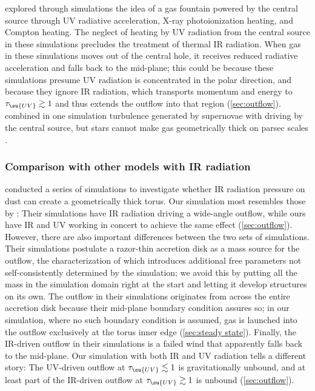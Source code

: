 \documentclass[twocolumn]{article}
\makeatletter
\newcommand*\Citetseealso[3]{%
  \Citeauthor{#1}\nameyeardelim\citetext{%
  \ifx\@empty#2\@empty\citeyear{#1}\else\citeyear{#1,#2}\fi
  \multicitedelim\citealp[see also][]{#3}}}
\newcommand*\xray{\texorpdfstring{X\protect\nobreakdash-ray}{X-ray}}
\makeatother
\begin{document}
\Citetseealso{2012ApJ...758...66W}{2015ApJ...812...82W}{2014MNRAS.445.3878S,
2016ApJ...828L..19W} explored through simulations the idea of a gas fountain
powered by the central source through \ac{UV} radiative acceleration, \xray{}
photoionization heating, and Compton heating. The neglect of heating by \ac{UV}
radiation from the central source in these simulations precludes the treatment
of thermal \ac{IR} radiation. When gas in these simulations moves out of the
central hole, it receives reduced radiative acceleration and falls back to the
mid-plane; this could be because these simulations presume \ac{UV} radiation is
concentrated in the polar direction, and because they ignore \ac{IR} radiation,
which transports momentum and energy to $\tau_\su{UV}\gtrsim1$ and thus extends
the outflow into that region (\cref{sec:outflow}). 
combined in one simulation turbulence generated by supernovae
\citep{2002ApJ...566L..21W} with driving by the central source, but stars
cannot make gas geometrically thick on parsec scales
\citep{1988ApJ...329..702K}.

\subsubsection{Comparison with other models with \texorpdfstring{\acs*{IR}}{IR}
radiation}

 conducted a series of simulations to
investigate whether \ac{IR} radiation pressure on dust can create a
geometrically thick torus. Our simulation most resembles those by
\citet{2012ApJ...747....8D}: Their simulations have \ac{IR} radiation driving a
wide-angle outflow, while ours have \ac{IR} and \ac{UV} working in concert to
achieve the same effect (\cref{sec:outflow}). However, there are also important
differences between the two sets of simulations. Their simulations postulate a
razor-thin accretion disk as a mass source for the outflow, the
characterization of which introduces additional free parameters not
self-consistently determined by the simulation; we avoid this by putting all
the mass in the simulation domain right at the start and letting it develop
structures on its own. The outflow in their simulations originates from across
the entire accretion disk because their mid-plane boundary condition assures
so; in our simulation, where no such boundary condition is assumed, gas is
launched into the outflow exclusively at the torus inner edge (\cref{sec:steady
state}). Finally, the \ac{IR}-driven outflow in their simulations is a failed
wind that apparently falls back to the mid-plane. Our simulation with both
\ac{IR} and \ac{UV} radiation tells a different story: The \ac{UV}-driven
outflow at $\tau_\su{UV}\lesssim1$ is gravitationally unbound, and at least
part of the \ac{IR}-driven outflow at $\tau_\su{UV}\gtrsim1$ is unbound
(\cref{sec:outflow}).
\end{document}
